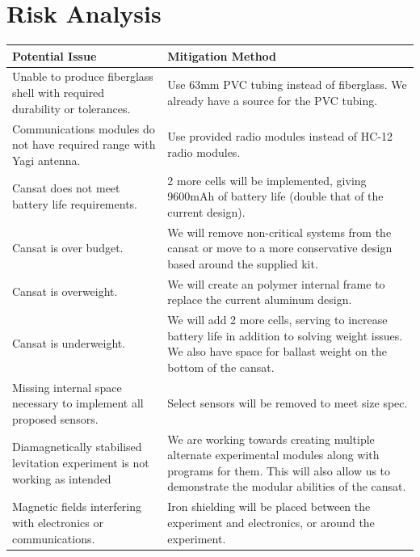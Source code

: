 \documentclass{report}
\begin{document}
	\section{Risk Analysis}
		\begin{table}[h!]
		\setlength{\tabcolsep}{6pt}
		\begin{tabularx}{\textwidth}{@{} YY @{}}
			\toprule
			\textbf{Potential Issue} & 
			\textbf{Mitigation Method}\\
			\midrule
			Unable to produce fiberglass shell with required durability or tolerances. &
			Use 63mm PVC tubing instead of fiberglass. We already have a source 
			for the PVC tubing.\\
			\addlinespace
			Communications modules do not have required range with Yagi antenna.  
			& Use provided radio modules instead of HC-12 radio modules.\\
			\addlinespace
			Cansat does not meet battery life requirements. & 
			2 more cells will be implemented, giving 9600mAh of battery life 
			(double that of the current design).\\
			\addlinespace
			Cansat is over budget. &
			We will remove non-critical systems from the cansat or move to a 
			more conservative design based around the supplied kit.\\
			\addlinespace
			Cansat is overweight. &
			We will create an polymer internal frame to replace the 
			current aluminum design.\\
			\addlinespace
			Cansat is underweight. &
			We will add 2 more cells, serving to increase battery life in addition to
			solving weight issues. We also have space for ballast weight on the
			bottom of the cansat.\\
			\addlinespace
			Missing internal space necessary to implement all proposed sensors. &
			Select sensors will be removed to meet size spec.\\
			\addlinespace
			{\color{blue}
			Diamagnetically stabilised levitation experiment is not working as 
			intended} &
			{\color{blue}We are working towards creating multiple alternate
			experimental modules
			along with programs for them. This will also allow us to demonstrate the
			modular abilities of the cansat.}\\
			\addlinespace
			Magnetic fields interfering with electronics or communications. &
			Iron shielding will be placed between the experiment and electronics, 
			or around the experiment.\\
			\bottomrule
		\end{tabularx}
		\end{table}
		\clearpage
\end{document}
